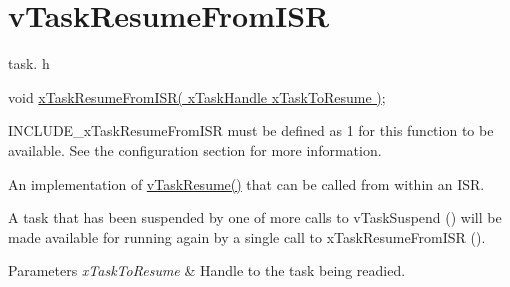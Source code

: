 \hypertarget{group__vTaskResumeFromISR}{}\section{v\+Task\+Resume\+From\+I\+SR}
\label{group__vTaskResumeFromISR}
task. h 
\begin{DoxyPre}void \hyperlink{task_8h_ac75832334133fef12c7a35119a678dfc}{xTaskResumeFromISR( xTaskHandle xTaskToResume )};\end{DoxyPre}


I\+N\+C\+L\+U\+D\+E\+\_\+x\+Task\+Resume\+From\+I\+SR must be defined as 1 for this function to be available. See the configuration section for more information.

An implementation of \hyperlink{task_8h_a70d003c5360a01fa0f7f19859cc2d907}{v\+Task\+Resume()} that can be called from within an I\+SR.

A task that has been suspended by one of more calls to v\+Task\+Suspend () will be made available for running again by a single call to x\+Task\+Resume\+From\+I\+SR ().


\begin{DoxyParams}{Parameters}
{\em x\+Task\+To\+Resume} & Handle to the task being readied. \\
\hline
\end{DoxyParams}
